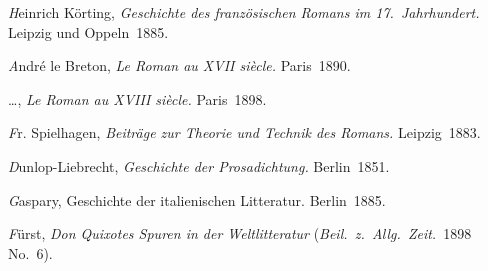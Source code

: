 {\emph Heinrich Körting,} {\it Geschichte des französischen Romans im 17.~Jahrhundert.}
Leipzig und Oppeln~1885.

{\emph André le Breton,} {\it Le Roman au XVII siècle.} Paris~1890.

\dots , {\it Le Roman au XVIII siècle.} Paris~1898.

{\emph Fr. Spielhagen,} {\it Beiträge zur Theorie und Technik des Romans.} Leipzig~1883.

{\emph Dunlop-Liebrecht,} {\it Geschichte der Prosadichtung.} Berlin~1851.

{\emph Gaspary,} Geschichte der italienischen Litteratur. Berlin~1885.

{\emph Fürst,} {\it Don Quixotes Spuren in der Weltlitteratur}
({\it Beil.\ z.\ Allg.\ Zeit.}\ 1898 No.~6).
